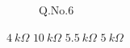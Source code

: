 \documentclass[legalpaper, 12pt, addpoints]{exam}
\begin{document}
\begin{questions}
\begin{figure}[h!]
\begin{circuitikz}[american]
\end{circuitikz}
\caption{Q.No.6}
\label{fig:6}
\end{figure}
\begin{oneparchoices}
    \choice $\SI{4}{k\Omega}$
    \CorrectChoice $\SI{10}{k\Omega}$
    \choice $\SI{5.5}{k\Omega}$
    \choice $\SI{5}{k\Omega}$
\end{oneparchoices}




\vspace{0.10in}

\end{questions}
\end{document}
